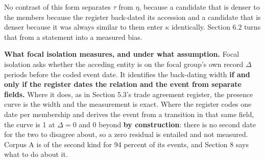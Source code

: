 \documentclass[twoside,11pt]{article}
\begin{document}
No contrast of this form separates \(\tau\) from \(\eta\), because a candidate that is denser to the members because the register back-dated its accession and a candidate that is denser because it was always similar to them enter \(\kappa\) identically. Section 6.2 turns that from a statement into a measured bias.

\textbf{What focal isolation measures, and under what assumption.} Focal isolation asks whether the acceding entity is on the focal group's own record \(\Delta\) periods before the coded event date. It identifies the back-dating width \textbf{if and only if the register dates the relation and the event from separate fields.} Where it does, as in Section 5.3's trade agreement register, the presence curve is the width and the measurement is exact. Where the register codes one date per membership and derives the event from a transition in that same field, the curve is 1 at \(\Delta = 0\) and 0 beyond \textbf{by construction}: there is no second date for the two to disagree about, so a zero residual is entailed and not measured. Corpus A is of the second kind for 94 percent of its events, and Section 8 says what to do about it.
\end{document}
